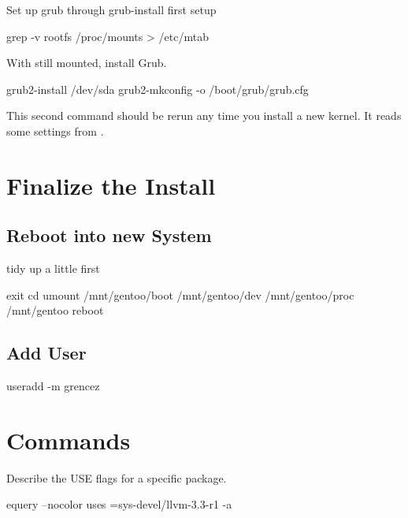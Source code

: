 Set up grub through grub-install
first setup 
\begin{code}
grep -v rootfs /proc/mounts > /etc/mtab
\end{code}
With  still mounted, install Grub.
\begin{code}
grub2-install /dev/sda
grub2-mkconfig -o /boot/grub/grub.cfg
\end{code}
This second command should be rerun any time you install a new kernel.
It reads some settings from .

\section{Finalize the Install}

\subsection{Reboot into new System}
tidy up a little first
\begin{code}
exit
cd
umount /mnt/gentoo/boot /mnt/gentoo/dev /mnt/gentoo/proc /mnt/gentoo
reboot
\end{code}

\subsection{Add User}

\begin{code}
useradd -m grencez
\end{code}

\section{Commands}
Describe the USE flags for a specific package.
\begin{code}
equery --nocolor uses =sys-devel/llvm-3.3-r1 -a
\end{code}




